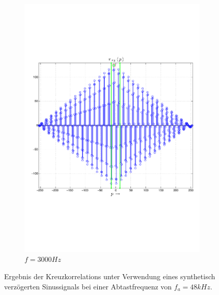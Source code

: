 \begin{figure}
\begin{subfigure}[b]{0.48\textwidth}
                \includegraphics[width=\textwidth]{grafiken/02_Konzeptionierung/sine_rxy_f_3000}
                \caption{$f=3000Hz$}
                \label{fig:sine_rxy_f_3000}
        \end{subfigure}
        \caption{Ergebnis der Kreuzkorrelations unter Verwendung eines synthetisch verzögerten Sinussignals bei einer Abtastfrequenz von $f_a=48kHz$.}
        \label{fig:Sim_sine_r_xy}
\end{figure}

